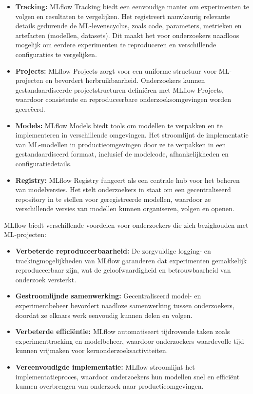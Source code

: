 \begin{itemize}
    \item \textbf{Tracking:} MLflow Tracking biedt een eenvoudige manier om experimenten te volgen en resultaten te vergelijken. Het registreert nauwkeurig relevante details gedurende de ML-levenscyclus, zoals code, parameters, metrieken en artefacten (modellen, datasets). Dit maakt het voor onderzoekers naadloos mogelijk om eerdere experimenten te reproduceren en verschillende configuraties te vergelijken.
    \item \textbf{Projects:} MLflow Projects zorgt voor een uniforme structuur voor ML-projecten en bevordert herbruikbaarheid. Onderzoekers kunnen gestandaardiseerde projectstructuren definiëren met MLflow Projects, waardoor consistente en reproduceerbare onderzoeksomgevingen worden gecreëerd.
    \item \textbf{Models:} MLflow Models biedt tools om modellen te verpakken en te implementeren in verschillende omgevingen. Het stroomlijnt de implementatie van ML-modellen in productieomgevingen door ze te verpakken in een gestandaardiseerd formaat, inclusief de modelcode, afhankelijkheden en configuratiedetails.
    \item \textbf{Registry:} MLflow Registry fungeert als een centrale hub voor het beheren van modelversies. Het stelt onderzoekers in staat om een gecentraliseerd repository in te stellen voor geregistreerde modellen, waardoor ze verschillende versies van modellen kunnen organiseren, volgen en openen.
\end{itemize}


MLflow biedt verschillende voordelen voor onderzoekers die zich bezighouden met ML-projecten:

\begin{itemize}
    \item \textbf{Verbeterde reproduceerbaarheid:} De zorgvuldige logging- en trackingmogelijkheden van MLflow garanderen dat experimenten gemakkelijk reproduceerbaar zijn, wat de geloofwaardigheid en betrouwbaarheid van onderzoek versterkt.
    \item \textbf{Gestroomlijnde samenwerking:} Gecentraliseerd model- en experimentbeheer bevordert naadloze samenwerking tussen onderzoekers, doordat ze elkaars werk eenvoudig kunnen delen en volgen.
    \item \textbf{Verbeterde efficiëntie:} MLflow automatiseert tijdrovende taken zoals experimenttracking en modelbeheer, waardoor onderzoekers waardevolle tijd kunnen vrijmaken voor kernonderzoeksactiviteiten.
    \item \textbf{Vereenvoudigde implementatie:} MLflow stroomlijnt het implementatieproces, waardoor onderzoekers hun modellen snel en efficiënt kunnen overbrengen van onderzoek naar productieomgevingen.
\end{itemize}


